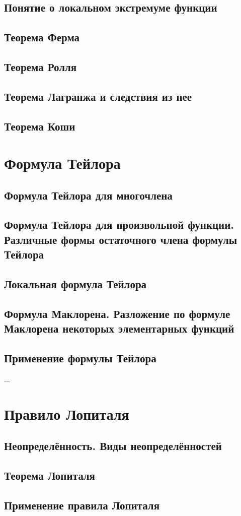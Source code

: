\subsection{Понятие о локальном экстремуме функции}

\subsection{Теорема Ферма}

\subsection{Теорема Ролля}

\subsection{Теорема Лагранжа и следствия из нее}

\subsection{Теорема Коши}


\section{Формула Тейлора}
\subsection{Формула Тейлора для многочлена}
\subsection{Формула Тейлора для произвольной функции. Различные формы остаточного члена формулы Тейлора}
\subsection{Локальная формула Тейлора}
\subsection{Формула Маклорена. Разложение по формуле Маклорена некоторых элементарных функций}
\subsection{Применение формулы Тейлора}
...

\section{Правило Лопиталя}
\subsection{Неопределённость. Виды неопределённостей}

\subsection{Теорема Лопиталя}

\subsection{Применение правила Лопиталя}


